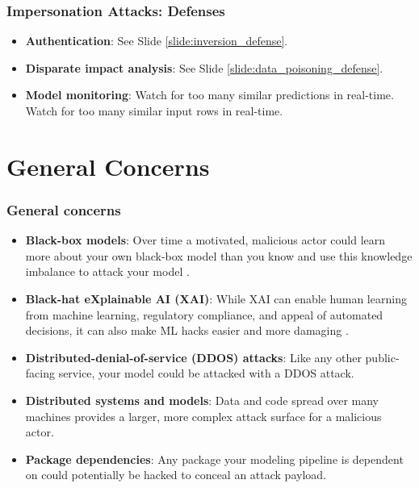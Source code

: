 \documentclass[11pt,
               aspectratio=169,
               hyperref={colorlinks}
               ]{beamer}
\begin{document}
			\begin{frame}
		
				\frametitle{Impersonation Attacks: \textbf{Defenses}}		
			
				\begin{itemize}
					\item \textbf{Authentication}: See Slide \ref{slide:inversion_defense}. 
					\item \textbf{Disparate impact analysis}: See Slide \ref{slide:data_poisoning_defense}.
					\item \textbf{Model monitoring}: Watch for too many similar predictions in real-time. Watch for too many similar input rows in real-time.
				\end{itemize}
				
			\end{frame}

	\section{General Concerns}

			\begin{frame}[t, allowframebreaks]	
		
				\frametitle{General concerns}	
				\footnotesize
				\begin{itemize}
					\item \textbf{Black-box models}: Over time a motivated, malicious actor could learn more about your own black-box model than you know and use this knowledge imbalance to attack your model \cite{papernot2018marauder}.
					\item \textbf{Black-hat eXplainable AI (XAI)}:  While XAI can enable human learning from machine learning, regulatory compliance, and appeal of automated decisions, it can also make ML hacks easier and more damaging \cite{shokri2019privacy}.
					\item \textbf{Distributed-denial-of-service (DDOS) attacks}: Like any other public-facing service, your model could be attacked with a DDOS attack.  
					\item \textbf{Distributed systems and models}: Data and code spread over many machines provides a larger, more complex attack surface for a malicious actor.
					\item \textbf{Package dependencies}: Any package your modeling pipeline is dependent on could potentially be hacked to conceal an attack payload.
				\end{itemize}
				\normalsize

			\end{frame}
\end{document}
